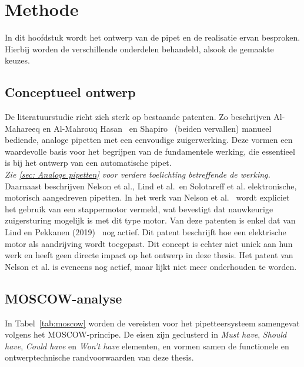 \chapter{Methode}
In dit hoofdstuk wordt het ontwerp van de pipet en de realisatie ervan besproken. Hierbij worden de verschillende onderdelen behandeld, alsook de gemaakte keuzes.

\section{Conceptueel ontwerp}
De literatuurstudie richt zich sterk op bestaande patenten. Zo beschrijven Al-Mahareeq en Al-Mahrouq Hasan~\cite{RN17} en Shapiro~\cite{RN16} (beiden vervallen) manueel bediende, analoge pipetten met een eenvoudige zuigerwerking. Deze vormen een waardevolle basis voor het begrijpen van de fundamentele werking, die essentieel is bij het ontwerp van een automatische pipet.
\\\textit{Zie \autoref{sec: Analoge pipetten} voor verdere toelichting betreffende de werking.}
\\[12pt]Daarnaast beschrijven Nelson et al., Lind et al.\ en Solotareff et al.\cite{RN35,RN36,RN38} elektronische, motorisch aangedreven pipetten. In het werk van Nelson et al.~\cite{RN35} wordt expliciet het gebruik van een stappermotor vermeld, wat bevestigt dat nauwkeurige zuigersturing mogelijk is met dit type motor. Van deze patenten is enkel dat van Lind en Pekkanen (2019)~\cite{RN36} nog actief. Dit patent beschrijft hoe een elektrische motor als aandrijving wordt toegepast. Dit concept is echter niet uniek aan hun werk en heeft geen directe impact op het ontwerp in deze thesis. Het patent van Nelson et al. is eveneens nog actief, maar lijkt niet meer onderhouden te worden.

\section{MOSCOW-analyse}
In Tabel~\ref{tab:moscow} worden de vereisten voor het pipetteersysteem samengevat volgens het MOSCOW-principe. De eisen zijn geclusterd in \textit{Must have}, \textit{Should have}, \textit{Could have} en \textit{Won’t have} elementen, en vormen samen de functionele en ontwerptechnische randvoorwaarden van deze thesis.

